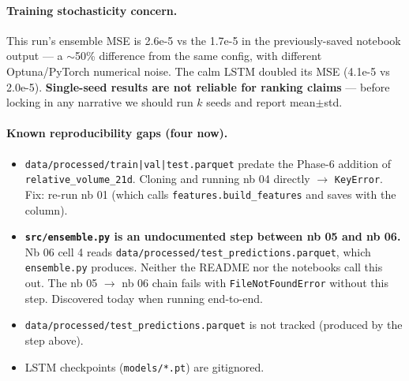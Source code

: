 \documentclass[11pt]{article}
\begin{document}
\paragraph{Training stochasticity concern.} This run's ensemble MSE is 2.6e-5 vs the 1.7e-5 in the previously-saved notebook output --- a $\sim$50\% difference from the same config, with different Optuna/PyTorch numerical noise. The calm LSTM doubled its MSE (4.1e-5 vs 2.0e-5). \textbf{Single-seed results are not reliable for ranking claims} --- before locking in any narrative we should run $k$ seeds and report mean$\pm$std.

\paragraph{Known reproducibility gaps (four now).}
\begin{itemize}[leftmargin=*]
  \item \texttt{data/processed/train|val|test.parquet} predate the Phase-6 addition of \texttt{relative\_volume\_21d}. Cloning and running nb 04 directly $\to$ \texttt{KeyError}. Fix: re-run nb 01 (which calls \texttt{features.build\_features} and saves with the column).
  \item \textbf{\texttt{src/ensemble.py} is an undocumented step between nb 05 and nb 06.} Nb 06 cell 4 reads \texttt{data/processed/test\_predictions.parquet}, which \texttt{ensemble.py} produces. Neither the README nor the notebooks call this out. The nb 05 $\to$ nb 06 chain fails with \texttt{FileNotFoundError} without this step. Discovered today when running end-to-end.
  \item \texttt{data/processed/test\_predictions.parquet} is not tracked (produced by the step above).
  \item LSTM checkpoints (\texttt{models/*.pt}) are gitignored.
\end{itemize}
\end{document}
